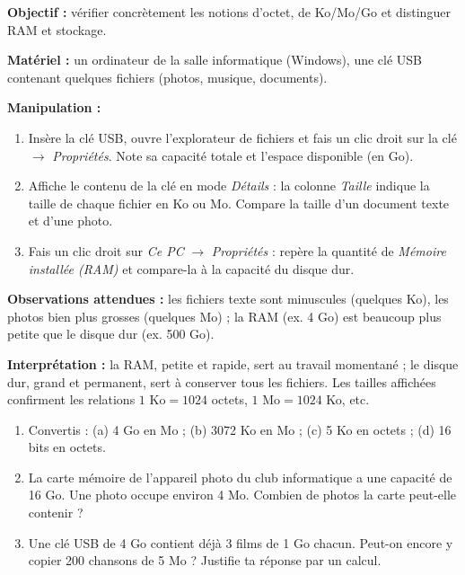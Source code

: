 \documentclass[11pt]{article}
\begin{document}
\begin{experience}
\textbf{Objectif :} vérifier concrètement les notions d'octet, de Ko/Mo/Go et distinguer RAM et stockage.

\textbf{Matériel :} un ordinateur de la salle informatique (Windows), une clé USB contenant quelques fichiers (photos, musique, documents).

\textbf{Manipulation :}
\begin{enumerate}
\item Insère la clé USB, ouvre l'explorateur de fichiers et fais un clic droit sur la clé $\to$ \emph{Propriétés}. Note sa capacité totale et l'espace disponible (en Go).
\item Affiche le contenu de la clé en mode \emph{Détails} : la colonne \emph{Taille} indique la taille de chaque fichier en Ko ou Mo. Compare la taille d'un document texte et d'une photo.
\item Fais un clic droit sur \emph{Ce PC} $\to$ \emph{Propriétés} : repère la quantité de \emph{Mémoire installée (RAM)} et compare-la à la capacité du disque dur.
\end{enumerate}

\textbf{Observations attendues :} les fichiers texte sont minuscules (quelques Ko), les photos bien plus grosses (quelques Mo) ; la RAM (ex. 4 Go) est beaucoup plus petite que le disque dur (ex. 500 Go).

\textbf{Interprétation :} la RAM, petite et rapide, sert au travail momentané ; le disque dur, grand et permanent, sert à conserver tous les fichiers. Les tailles affichées confirment les relations $1 \text{ Ko} = 1024$ octets, $1 \text{ Mo} = 1024$ Ko, etc.
\end{experience}

\begin{exercice}
\begin{enumerate}
\item Convertis : (a) 4 Go en Mo ; (b) 3072 Ko en Mo ; (c) 5 Ko en octets ; (d) 16 bits en octets.
\item La carte mémoire de l'appareil photo du club informatique a une capacité de 16 Go. Une photo occupe environ 4 Mo. Combien de photos la carte peut-elle contenir ?
\item Une clé USB de 4 Go contient déjà 3 films de 1 Go chacun. Peut-on encore y copier 200 chansons de 5 Mo ? Justifie ta réponse par un calcul.
\end{enumerate}
\end{exercice}
\end{document}
